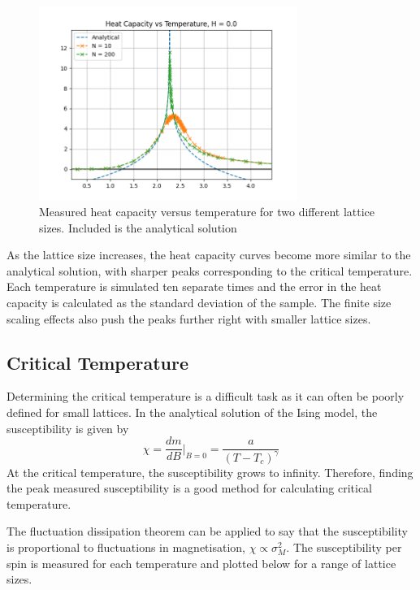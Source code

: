 \documentclass[a4paper, 12pt]{article}
\begin{document}
\begin{figure}[H]
\centering
\includegraphics[width=0.75\textwidth]{./resources/heat_capacity.png}
\caption{Measured heat capacity versus temperature for two different lattice sizes. Included is the analytical solution}
\end{figure}

As the lattice size increases, the heat capacity curves become more similar to the analytical solution, with sharper peaks corresponding to the critical temperature. Each temperature is simulated ten separate times and the error in the heat capacity is calculated as the standard deviation of the sample. The finite size scaling effects also push the peaks further right with smaller lattice sizes.


\subsection{Critical Temperature}
Determining the critical temperature is a difficult task as it can often be poorly defined for small lattices. In the analytical solution of the Ising model, the susceptibility is given by
\[ \chi = \frac{dm}{dB}|_{B=0} = \frac{a}{(T-T_c)^\gamma} \]
At the critical temperature, the susceptibility grows to infinity. Therefore, finding the peak measured susceptibility is a good method for calculating critical temperature. 

The fluctuation dissipation theorem \cite{4} can be applied to say that the susceptibility is proportional to fluctuations in magnetisation,  \( \chi \propto \sigma_M^2 \). The susceptibility per spin is measured for each temperature and plotted below for a range of lattice sizes. 
\end{document}
